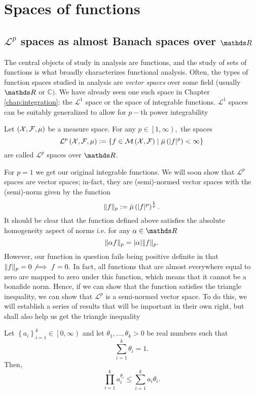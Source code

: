 
\chapter{Spaces of functions\label{chap:spaces_of_functions}}

\section{$\mathcal{L}^{p}$ spaces as almost Banach spaces over $\protect\R$}

The central objects of study in analysis are functions, and the study
of sets of functions is what broadly characterizes functional analysis.
Often, the types of function spaces studied in analysis are \emph{vector
spaces }over some field (usually $\R$ or $\mathds{C})$. We have
already seen one such space in Chapter \ref{chap:integration}: the
$\mathcal{L}^{1}$ space or the space of integrable functions. $\mathcal{L}^{1}$
spaces can be suitably generalized to allow for $p-$th power integrability
\begin{defn}
\label{def:LpSpace}Let $\left(\mathcal{X},\mathcal{F},\mu\right)$ be a measure space.
For any $p\in\left[1,\infty\right),$ the spaces 
\[
\mathcal{L}^{p}\left(\mathcal{X},\mathcal{F},\mu\right):=\left\{ f\in\mathcal{M}\left(\mathcal{X},\mathcal{F}\right)\mid\bar{\mu}\left(\lvert f\rvert^{p}\right)<\infty\right\} 
\]
are called $\mathcal{L}^{p}$ spaces over $\R$.
\end{defn}

For $p=1$ we get our original integrable functions. We will soon
show that $\mathcal{L}^{p}$ spaces are vector spaces; in-fact, they
are (semi)-normed vector spaces with the (semi)-norm given by the
function
\[
\lVert f\rVert_{p}:=\bar{\mu}\left(\lvert f\rvert^{p}\right)^{\frac{1}{p}}.
\]
It should be clear that the function defined above satisfies the absolute
homogeneity aspect of norms i.e. for any $\alpha\in\R$ 
\[
\lVert\alpha f\rVert_{p}=\lvert\alpha\rvert\lVert f\rVert_{p}.
\]
However, our function in question fails being positive definite in
that $\lVert f\rVert_{p}=0\not\implies f=0.$ In fact, all functions that are
almost everywhere equal to zero are mapped to zero under this function,
which means that it cannot be a bonafide norm. Hence, if we can show
that the function satisfies the triangle inequality, we can show that
$\mathcal{L}^{p}$ is a semi-normed vector space. To do this, we will
establish a series of results that will be important in their own
right, but shall also help us get the triangle inequality
\begin{lem}
\label{lem:amGmInequality}Let $\left\{ a_{i}\right\} _{i=1}^{k}\in\left[0,\infty\right)$
and let $\theta_{1},\ldots,\theta_{k}>0$ be real numbers such that
\[
\sum_{i=1}^{k}\theta_{i}=1.
\]
Then,
\[
\prod_{i=1}^{k}a_{i}^{\theta_{i}}\leq\sum_{i=1}^{k}a_{i}\theta_{i}.
\]
\end{lem}

